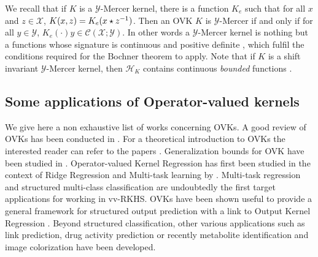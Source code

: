 \documentclass[twoside,11pt]{article}
\begin{document}
 We recall that if $K$ is a $\mathcal{Y}$-Mercer kernel, there is a function
 $K_e$ such that for all $x$ and $z\in\mathcal{X}$, $K(x, z)=K_e(x\star
 z^{-1})$. Then an \acs{OVK} $K$ is $\mathcal{Y}$-Mercer if and only if for all
 $y\in\mathcal{Y}$, $K_e(\cdot)y\in\mathcal{C}(\mathcal{X};\mathcal{Y})$. In
 other words a $\mathcal{Y}$-Mercer kernel is nothing but a functions whose
 signature is continuous and positive definite \citep{Carmeli2010}, which
 fulfil the conditions required for the  Bochner theorem
 to apply.  Note that if $K$ is a shift invariant $\mathcal{Y}$-Mercer kernel,
 then $\mathcal{H}_K$ contains continuous \emph{bounded} functions
 \citep{Carmeli2010}.
\subsection{Some applications of Operator-valued kernels}
We give here a non exhaustive list of works concerning \aclp{OVK}.  A good
review of \aclp{OVK} has been conducted in \citet{Alvarez2012}. For a
theoretical introduction to \acsp{OVK} the interested reader can refer to the
papers \citet{carmeli2006vector, caponnetto2008, Carmeli2010}. Generalization
bounds for \acs{OVK} have been studied in \citet{Sindhwani2013,
kadri2015operator,sangnier2016joint, maurer2016vector}.  Operator-valued Kernel
Regression has first been studied in the context of Ridge Regression and
Multi-task learning by \citet{Micchelli2005}.  Multi-task regression
\citep{micchelli2004kernels}  and structured multi-class classification
\citep{Dinuzzo2011,minh2013unifying,mroueh2012multiclass} are undoubtedly the
first target applications for working in \acl{vv-RKHS}.  \aclp{OVK} have been
shown useful to provide a general framework for structured output prediction
\citep{Brouard2011,Brouard2016_jmlr} with a link to Output Kernel Regression
\citep{Kadri_icml2013}. Beyond structured classification, other various
applications such as link prediction, drug activity prediction or recently
metabolite identification \citep{brouard2016fast} and  image colorization
\citep{ha2010image} have been developed.
\end{document}
